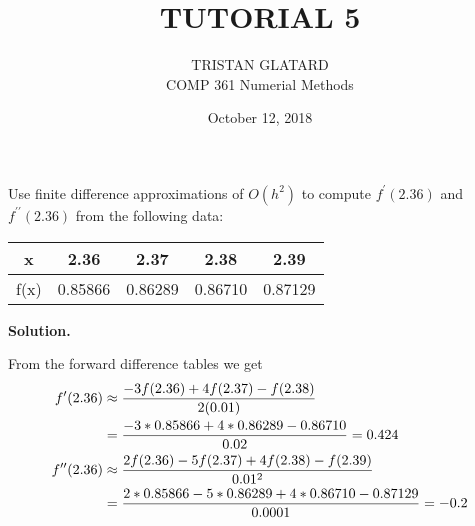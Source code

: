  

 

\title{TUTORIAL 5}%
\author{TRISTAN GLATARD\\ %
COMP 361 Numerial Methods} %
\date{October 12, 2018} 
\maketitle

\begin{exercise}{1} %
Use finite difference approximations of \(O(h^2)\) to compute \(f^\prime (2.36)\) and \(f^{\prime \prime} (2.36)\) from the following data:

\begin{table}[h]
\centering
\begin{tabular}{|c|c|c|c|c|}
\hline
x & 2.36 & 2.37 & 2.38 & 2.39 \\ \hline
f(x) & 0.85866 & 0.86289 & 0.86710 & 0.87129 \\ \hline
\end{tabular}
\end{table}

\textbf{Solution.} 

From the forward difference tables we get
\begin{align}
f^\prime(2.36) &\approx \frac{-3f(2.36) + 4f(2.37) - f(2.38)}{2(0.01)} \notag \\
&= \frac{-3*0.85866 + 4*0.86289-0.86710}{0.02} = 0.424 \notag \\
f^ {\prime \prime}(2.36) &\approx \frac{2f(2.36) -5f(2.37) + 4f(2.38) - f(2.39)}{0.01^2} \notag \\
&= \frac{2*0.85866 -5*0.86289+4*0.86710-0.87129}{0.0001} = -0.2 \notag
\end{align}
\end{exercise}


